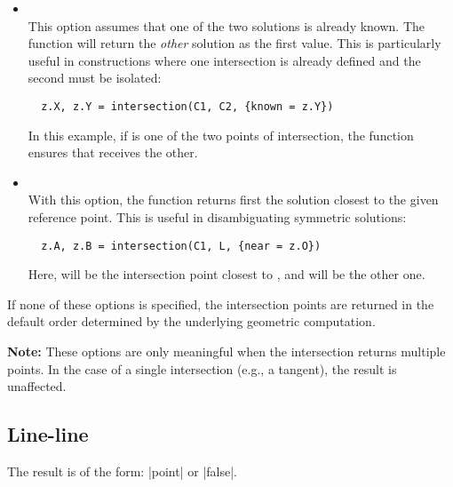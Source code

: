 \begin{itemize}
  \item {}  \\
  This option assumes that one of the two solutions is already known. The function will return the \emph{other} solution as the first value. This is particularly useful in constructions where one intersection is already defined and the second must be isolated:
  \begin{mybox}
  \begin{verbatim}
  z.X, z.Y = intersection(C1, C2, {known = z.Y})
  \end{verbatim}
  \end{mybox}
  In this example, if  is one of the two points of intersection, the function ensures that  receives the other.

  \item {}  \\
  With this option, the function returns first the solution closest to the given reference point. This is useful in disambiguating symmetric solutions:
  \begin{mybox}
  \begin{verbatim}
  z.A, z.B = intersection(C1, L, {near = z.O})
  \end{verbatim}
  \end{mybox}
  Here,  will be the intersection point closest to , and  will be the other one.
\end{itemize}

If none of these options is specified, the intersection points are returned in the default order determined by the underlying geometric computation.

\medskip
\noindent
\textbf{Note:} These options are only meaningful when the intersection returns multiple points. In the case of a single intersection (e.g., a tangent), the result is unaffected.

\subsection{Line-line}
\label{sub:line_line}

The result is of the form: |point| or |false|.


